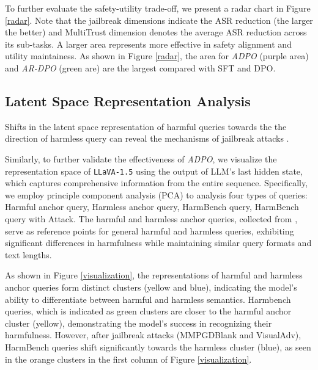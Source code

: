 To further evaluate the safety-utility trade-off, we present a radar chart in Figure \ref{radar}. Note that the jailbreak dimensions indicate the ASR reduction (the larger the better) and MultiTrust dimension denotes the average ASR reduction across its sub-tasks.  A larger area represents more effective in safety alignment and utility maintainess.  As shown in Figure \ref{radar}, the area for \textit{ADPO} (purple area) and  \textit{AR-DPO} (green are) are the largest compared with SFT and DPO.


\vspace{-0.5em}
\subsection{Latent Space Representation Analysis}
\vspace{-0.5em}
Shifts in the latent space representation of harmful queries towards the the direction of harmless query can reveal the mechanisms of jailbreak attacks \cite{lin2024towards}. 

Similarly, to further validate the effectiveness of \textit{ADPO}, we visualize the representation space of \texttt{LLaVA-1.5} using the output of LLM's last hidden state, which captures comprehensive information from the entire sequence. Specifically, we employ principle component analysis (PCA) \cite{PCA} to analysis four types of queries: Harmful anchor query, Harmless anchor query, HarmBench query, HarmBench query with Attack. The harmful and harmless anchor queries, collected from  \cite{zheng2024prompt}, serve as reference points for general harmful and harmless queries, exhibiting significant differences in harmfulness while maintaining similar query formats and text lengths.



As shown in Figure \ref{visualization}, the representations of harmful and harmless anchor queries form distinct clusters (yellow and blue), indicating the model's ability to differentiate between harmful and harmless semantics. Harmbench queries, which is indicated as green clusters are closer to the harmful anchor cluster (yellow), demonstrating the model's success in recognizing their harmfulness. However, after jailbreak attacks (MMPGDBlank and VisualAdv), HarmBench queries shift significantly towards the harmless cluster (blue), as seen in the orange clusters in the first column of Figure \ref{visualization}.

